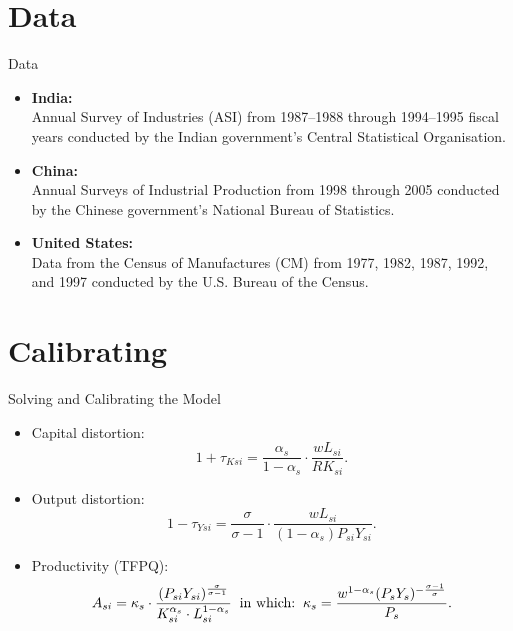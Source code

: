 \documentclass[10pt]{beamer}
\begin{document}
\section{Data}

\begin{frame}{Data}
    \begin{itemize}
        \item \textbf{India:}\\ Annual Survey of Industries (ASI) from 1987–1988 through 1994–1995 fiscal years conducted by the Indian government's Central Statistical Organisation.
        \item \textbf{China:}\\ Annual Surveys of Industrial Production from 1998 through 2005 conducted by the Chinese government's National Bureau of Statistics.
        \item \textbf{United States:}\\Data from the Census of Manufactures (CM) from 1977, 1982, 1987, 1992, and 1997 conducted by the U.S. Bureau of the Census.
    \end{itemize}
\end{frame}

\section{Calibrating}
\begin{frame}{Solving and Calibrating the Model}
    \begin{itemize}
        \item Capital distortion:
        \begin{equation}
            1 + \tau_{Ksi} = \frac{\alpha_s}{1 - \alpha_s} \cdot \frac{w   L_{si}}{R{K_{si}}}.
        \end{equation}
        \item Output distortion:
        \begin{equation}
            1 - \tau_{Ysi} = \frac{\sigma}{\sigma - 1} \cdot  \frac{wL_{si}}{(1 - \alpha_s) P_{si}Y_{si}}.
        \end{equation}
        \item Productivity (TFPQ):
        \begin{equation}
            A_{si} = \kappa_s \cdot\dfrac{ (P_{si}Y_{si})^{\frac{\sigma}{\sigma - 1}}}{ K_{si}^{\alpha_s} \cdot L_{si}^{1 - \alpha_s}} \text{\;\;in which:\;\;} \kappa_s = \frac{w^{1 - \alpha_s} (P_s Y_s)^{-\frac{\sigma - 1}{\sigma}}}{P_s}.
        \end{equation}
    \end{itemize}
\end{frame}
\end{document}
